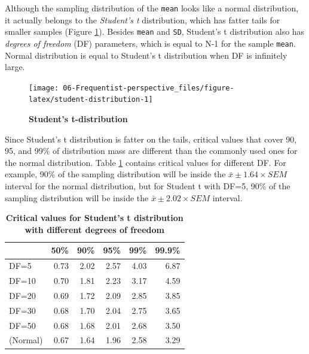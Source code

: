 \documentclass[
]{book}
\begin{document}
Although the sampling distribution of the \texttt{mean} looks like a normal distribution, it actually belongs to the \emph{Student's t} distribution, which has fatter tails for smaller samples (Figure \ref{fig:student-distribution}). Besides \texttt{mean} and \texttt{SD}, Student's t distribution also has \emph{degrees of freedom} (DF) parameters, which is equal to N-1 for the sample \texttt{mean}. Normal distribution is equal to Student's t distribution when DF is infinitely large.

\begin{figure}

{\centering \texttt{[image: 06-Frequentist-perspective\_files/figure-latex/student-distribution-1]} 

}

\caption{\textbf{Student's t-distribution}}\label{fig:student-distribution}
\end{figure}



Since Student's t distribution is fatter on the tails, critical values that cover 90, 95, and 99\% of distribution mass are different than the commonly used ones for the normal distribution. Table \ref{tab:student-critical-values} contains critical values for different DF. For example, 90\% of the sampling distribution will be inside the \(\bar{x} \pm 1.64 \times SEM\) interval for the normal distribution, but for Student t with DF=5, 90\% of the sampling distribution will be inside the \(\bar{x} \pm 2.02 \times SEM\) interval.



\begin{table}

\caption{\label{tab:student-critical-values}\textbf{Critical values for Student's t distribution with different degrees of freedom}}
\centering
\begin{tabular}[t]{lrrrrr}
\toprule
 & 50\% & 90\% & 95\% & 99\% & 99.9\%\\
\midrule
DF=5 & 0.73 & 2.02 & 2.57 & 4.03 & 6.87\\
DF=10 & 0.70 & 1.81 & 2.23 & 3.17 & 4.59\\
DF=20 & 0.69 & 1.72 & 2.09 & 2.85 & 3.85\\
DF=30 & 0.68 & 1.70 & 2.04 & 2.75 & 3.65\\
DF=50 & 0.68 & 1.68 & 2.01 & 2.68 & 3.50\\
\addlinespace
(Normal) & 0.67 & 1.64 & 1.96 & 2.58 & 3.29\\
\bottomrule
\end{tabular}
\end{table}
\end{document}
